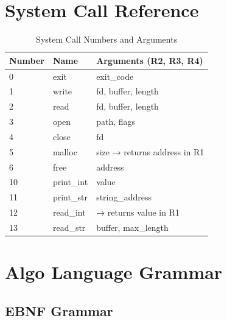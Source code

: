 \documentclass[12pt,a4paper,oneside]{book}
\begin{document}
\chapter{System Call Reference}

\begin{table}[H]
\centering
\caption{System Call Numbers and Arguments}
\small
\begin{tabularx}{\textwidth}{|l|l|X|}
\hline
\textbf{Number} & \textbf{Name} & \textbf{Arguments (R2, R3, R4)} \\
\hline
0 & exit & exit\_code \\
1 & write & fd, buffer, length \\
2 & read & fd, buffer, length \\
3 & open & path, flags \\
4 & close & fd \\
5 & malloc & size → returns address in R1 \\
6 & free & address \\
10 & print\_int & value \\
11 & print\_str & string\_address \\
12 & read\_int & → returns value in R1 \\
13 & read\_str & buffer, max\_length \\
\hline
\end{tabularx}
\end{table}

\chapter{Algo Language Grammar}

\section{EBNF Grammar}
\end{document}
